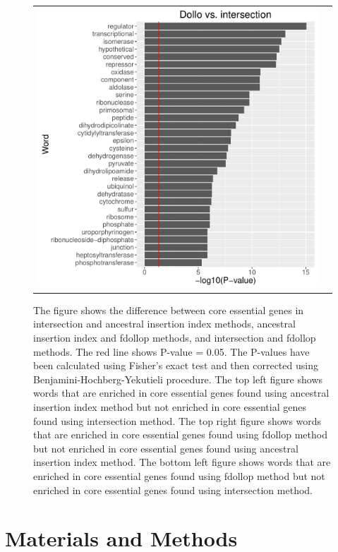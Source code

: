 \documentclass[12pt,letterpaper]{article}
\begin{document}
\begin{figure}
\begin{tabular}{c c}
\includegraphics[scale=0.4]{dollo-intersection-pval.pdf}&
\end{tabular}
\caption{The figure shows the difference between core essential genes in intersection and ancestral insertion index methods, ancestral insertion index and fdollop methods, and intersection and fdollop methods. The red line shows P-value = 0.05. The P-values have been calculated using Fisher's exact test and then corrected using Benjamini-Hochberg-Yekutieli procedure. The top left figure shows words that are enriched in core essential genes found using ancestral insertion index method but not enriched in core essential genes found using intersection method. The top right figure shows words that are enriched in core essential genes found using fdollop method but not enriched in core essential genes found using ancestral insertion index method. The bottom left figure shows words that are enriched in core essential genes found using fdollop method but not enriched in core essential genes found using intersection method.}
\label{fig:method-difference}
\end{figure}

\section{Materials and Methods}
\end{document}
